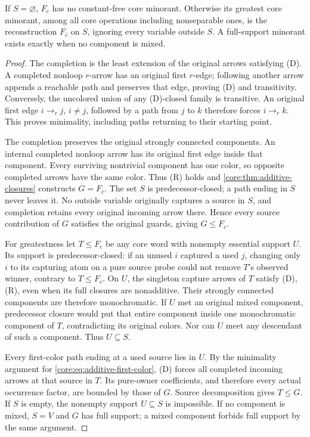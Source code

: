 \begin{theorem}
\label{core:thm:additive-greatest-minorant}
If $S=\varnothing$, $F_c$ has no constant-free core minorant.
Otherwise its greatest core minorant, among all core operations
including nonseparable ones, is the reconstruction $F_{\bar c}$
on $S$, ignoring every variable outside $S$.
A full-support minorant exists exactly when no component is mixed.
\end{theorem}
\begin{proof}
The completion is the least extension of the original arrows satisfying
(D). A completed nonloop $r$-arrow has an original first $r$-edge;
following another arrow appends a reachable path and preserves that
edge, proving (D) and transitivity. Conversely, the uncolored union
of any (D)-closed family is transitive. An original first edge
$i\to_r j$, $i\ne j$, followed by a path from $j$ to $k$ therefore
forces $i\to_r k$. This proves minimality, including paths returning
to their starting point.

The completion preserves the original strongly connected components.
An internal completed nonloop arrow has its original first edge
inside that component. Every surviving nontrivial component has one
color, so opposite completed arrows have the same color. Thus (R)
holds and \cref{core:thm:additive-closures} constructs $G=F_{\bar c}$.
The set $S$ is predecessor-closed; a path ending in $S$ never leaves
it. No outside variable originally captures a source in $S$, and
completion retains every original incoming arrow there. Hence every
source contribution of $G$ satisfies the original guards, giving
$G\leq F_c$.

For greatestness let $T\leq F_c$ be any core word with nonempty
essential support $U$. Its support is predecessor-closed: if an
unused $i$ captured a used $j$, changing only $i$ to its capturing
atom on a pure source probe could not remove $T$'s observed winner,
contrary to $T\leq F_c$. On $U$, the singleton capture arrows of
$T$ satisfy (D),(R), even when its full closures are nonadditive.
Their strongly connected components are therefore monochromatic.
If $U$ met an original mixed component, predecessor closure would
put that entire component inside one monochromatic component of $T$,
contradicting its original colors. Nor can $U$ meet any descendant
of such a component. Thus $U\subseteq S$.

Every first-color path ending at a used source lies in $U$. By the
minimality argument for \eqref{core:eq:additive-first-color}, (D)
forces all completed incoming arrows at that source in $T$.
Its pure-owner coefficients, and therefore every actual occurrence
factor, are bounded by those of $G$. Source decomposition gives
$T\leq G$. If $S$ is empty, the nonempty support $U\subseteq S$
is impossible. If no component is mixed, $S=V$ and $G$ has full
support; a mixed component forbids full support by the same argument.
\end{proof}

